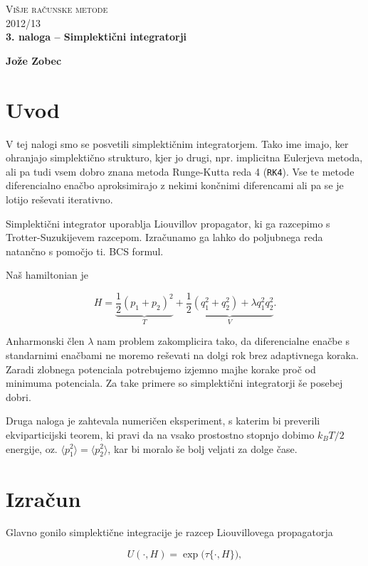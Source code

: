 \documentclass[a4 paper, 12pt]{article}
\begin{document}
\begin{center}
\textsc{Višje računske metode}\\
\textsc{2012/13}\\[0.5cm]
\textbf{3. naloga -- Simplektični integratorji}
\end{center}
\begin{flushright}
\textbf{Jože Zobec}
\end{flushright}

\section{Uvod}

V tej nalogi smo se posvetili simplektičnim integratorjem. Tako ime imajo, ker ohranjajo simplektično strukturo, kjer
jo drugi, npr. implicitna Eulerjeva metoda, ali pa tudi vsem dobro znana metoda Runge-Kutta reda 4 ({\tt RK4}). Vse te
metode diferencialno enačbo aproksimirajo z nekimi končnimi diferencami ali pa se je lotijo reševati iterativno.

Simplektični integrator uporablja Liouvillov propagator, ki ga razcepimo s Trotter-Suzukijevem razcepom. Izračunamo
ga lahko do poljubnega reda natančno s pomočjo ti. BCS formul.

Naš hamiltonian je

\[
	H = \underbrace{\frac{1}{2}(p_1 + p_2)^2}_T + \underbrace{\frac{1}{2}(q_1^2 + q_2^2) + \lambda q_1^2q_2^2}_V.
\]

Anharmonski člen $\lambda$ nam problem zakomplicira tako, da diferencialne enačbe s standarnimi enačbami ne moremo
reševati na dolgi rok brez adaptivnega koraka. Zaradi zlobnega potenciala potrebujemo izjemno majhe korake proč od
minimuma potenciala. Za take primere so simplektični integratorji še posebej dobri.

Druga naloga je zahtevala numeričen eksperiment, s katerim bi preverili ekviparticijski teorem, ki pravi da na vsako
prostostno stopnjo dobimo $k_BT/2$ energije, oz. $\langle p_1^2 \rangle = \langle p_2^2 \rangle$, kar bi moralo še
bolj veljati za dolge čase.

\section{Izračun}

Glavno gonilo simplektične integracije je razcep Liouvillovega propagatorja

\begin{equation}
	U(\cdot, H) = \exp\Big(\tau\{\cdot, H\}\Big),
\end{equation}
\end{document}
